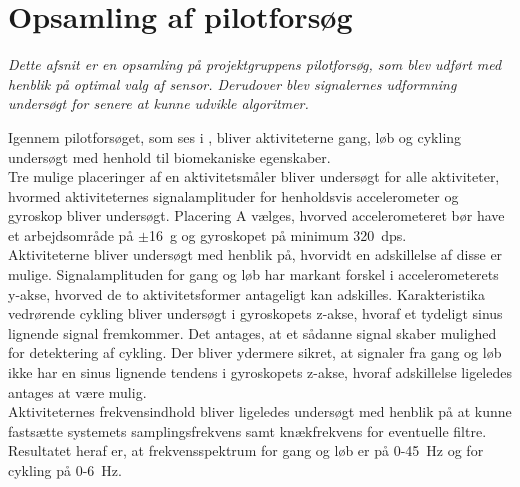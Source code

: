 \section{Opsamling af pilotforsøg}\label{opsamling_pilot}
\textit{Dette afsnit er en opsamling på projektgruppens pilotforsøg, som blev udført med henblik på optimal valg af sensor. Derudover blev signalernes udformning undersøgt for senere at kunne udvikle algoritmer.}

Igennem pilotforsøget, som ses i , bliver aktiviteterne gang, løb og cykling undersøgt med henhold til biomekaniske egenskaber. \\
Tre mulige placeringer af en aktivitetsmåler bliver undersøgt for alle aktiviteter, hvormed aktiviteternes signalamplituder for henholdsvis accelerometer og gyroskop bliver undersøgt. Placering A vælges, hvorved accelerometeret bør have et arbejdsområde på $\pm$16~g og gyroskopet på minimum 320~dps. \\
Aktiviteterne bliver undersøgt med henblik på, hvorvidt en adskillelse af disse er mulige. Signalamplituden for gang og løb har markant forskel i accelerometerets y-akse, hvorved de to aktivitetsformer antageligt kan adskilles. Karakteristika vedrørende cykling bliver undersøgt i gyroskopets z-akse, hvoraf et tydeligt sinus lignende signal fremkommer. Det antages, at et sådanne signal skaber mulighed for detektering af cykling. Der bliver ydermere sikret, at signaler fra gang og løb ikke har en sinus lignende tendens i gyroskopets z-akse, hvoraf adskillelse ligeledes antages at være mulig. \\
Aktiviteternes frekvensindhold bliver ligeledes undersøgt med henblik på at kunne fastsætte systemets samplingsfrekvens samt knækfrekvens for eventuelle filtre. Resultatet heraf er, at frekvensspektrum for gang og løb er på 0-45~Hz og for cykling på 0-6~Hz.

